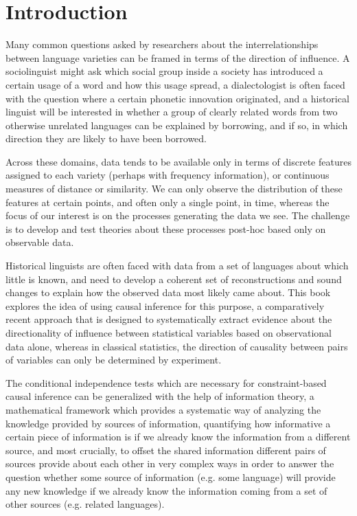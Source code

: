 \chapter{Introduction}
Many common questions asked by researchers about the interrelationships between language varieties can be framed in terms of the direction of influence. A sociolinguist might ask which social group inside a society has introduced a certain usage of a word and how this usage spread, a dialectologist is often faced with the question where a certain phonetic innovation originated, and a historical linguist will be interested in whether a group of clearly related words from two otherwise unrelated languages can be explained by borrowing, and if so, in which direction they are likely to have been borrowed.

Across these domains, data tends to be available only in terms of discrete features assigned to each variety (perhaps with frequency information), or continuous measures of distance or similarity. We can only observe the distribution of these features at certain points, and often only a single point, in time, whereas the focus of our interest is on the processes generating the data we see. The challenge is to develop and test theories about these processes post-hoc based only on observable data. 

Historical linguists are often faced with data from a set of languages about which little is known, and need to develop a coherent set of reconstructions and sound changes to explain how the observed data most likely came about. This book explores the idea of using causal inference for this purpose, a comparatively recent approach that is designed to systematically extract evidence about the directionality of influence between statistical variables based on observational data alone, whereas in classical statistics, the direction of causality between pairs of variables can only be determined by experiment.

The conditional independence tests which are necessary for constraint-based causal inference can be generalized with the help of information theory, a mathematical framework which provides a systematic way of analyzing the knowledge provided by sources of information, quantifying how informative a certain piece of information is if we already know the information from a different source, and most crucially, to offset the shared information different pairs of sources provide about each other in very complex ways in order to answer the question whether some source of information (e.g. some language) will provide any new knowledge if we already know the information coming from a set of other sources (e.g. related languages).

